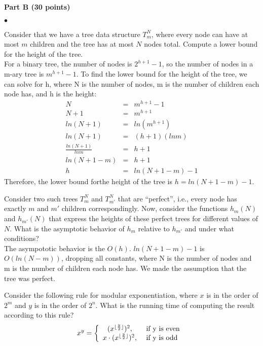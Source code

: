 \documentclass{article}
\newenvironment{myitem}{\begin{list}{$\bullet$}
{\setlength{\itemsep}{-0pt}
\setlength{\topsep}{0pt}
\setlength{\labelwidth}{0pt}
\setlength{\leftmargin}{10pt}
\setlength{\parsep}{-0pt}
\setlength{\itemsep}{0pt}
\setlength{\partopsep}{0pt}}}%
{\end{list}}
\begin{document}
\begin{center}
{\bf Part B (30 points)}
\end{center}

\begin{myitem}
\item Consider that we have a tree data structure $T_m^N$, where every
  node can have at most $m$ children and the tree has at most $N$
  nodes total. Compute a lower bound for the height of the tree.\\

For a binary tree, the number of nodes is $2^{h+1}-1$, so the number of nodes in a m-ary tree is $m^{h+1}-1$. To find the lower bound for the height of the tree, we can solve for h, where N is the number of nodes, m is the number of children each node has, and h is the height:
\begin{eqnarray*}
	N &=& m^{h+1}-1\\
	N+1 &=& m^{h+1}\\
	ln(N+1) &=& ln(m^{h+1})\\
	ln(N+1) &=& (h+1)(lnm)\\
	\frac{ln(N+1)}{lnm} &=& h+1\\
	ln(N+1-m) &=& h+1\\
	h &=& ln(N+1-m)-1
\end{eqnarray*}
Therefore, the lower bound forthe height of the tree is $h=ln(N+1-m)-1$.\\

\item Consider two such trees $T_m^N$ and $T_{m'}^N$ that are
  ``perfect'', i.e., every node has exactly $m$ and $m'$ children
  correspondingly. Now, consider the functions $h_m(N)$ and
  $h_{m'}(N)$ that express the heights of these perfect trees for
  different values of $N$. What is the asymptotic behavior of $h_m$
  relative to $h_{m'}$ and under what conditions?\\

The asympototic behavior is the $O(h)$. $ln(N+1-m)-1$ is $O(ln(N-m))$, dropping all constants, where N is the number of nodes and m is the number of children each node has. We made the assumption that the tree was perfect. \\

\item Consider the following rule for modular exponentiation, where
  $x$ is in the order of $2^m$ and $y$ is in the order of $2^n$. What
  is the running time of computing the result according to this rule?
$$x^y = \left\{
\begin{array}{c l}     
    (x ^{\lfloor \frac{y}{2} \rfloor} )^2,  & \textrm{ if y is even }\\
    x \cdot (x^{\lfloor \frac{y}{2} \rfloor} )^2, & \textrm{ if y is odd}
\end{array}\right.$$


\end{myitem}
\end{document}
